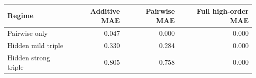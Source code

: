 \begin{tabular}{lrrr}
\toprule
Regime & Additive MAE & Pairwise MAE & Full high-order MAE \\
\midrule
Pairwise only & 0.047 & 0.000 & 0.000 \\
Hidden mild triple & 0.330 & 0.284 & 0.000 \\
Hidden strong triple & 0.805 & 0.758 & 0.000 \\
\bottomrule
\end{tabular}
